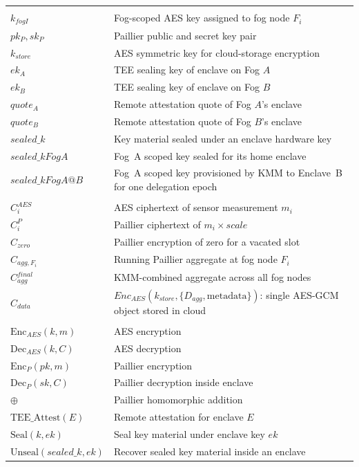 \documentclass[conference]{IEEEtran}
\begin{document}
\begin{table}[htbp]
\begin{tabular}{@{}>{\raggedright\arraybackslash}p{}>{\raggedright\arraybackslash}p{}@{}}
    \multicolumn{2}{l}{\textit{Key Material}} \\

    $k_{fogI}$ & Fog-scoped AES key assigned to fog node $F_i$ \\
    $pk_P, sk_P$ & Paillier public and secret key pair \\
    $k_{store}$ & AES symmetric key for cloud-storage encryption \\
    $ek_A$ & TEE sealing key of enclave on Fog $A$ \\
    $ek_B$ & TEE sealing key of enclave on Fog $B$ \\
    $quote_A$ & Remote attestation quote of Fog $A$'s enclave \\
    $quote_B$ & Remote attestation quote of Fog $B$'s enclave \\
    $sealed\_k$ & Key material sealed under an enclave hardware key \\
    $sealed\_kFogA$ & Fog~A scoped key sealed for its home enclave \\
    $sealed\_kFogA@B$ & Fog~A scoped key provisioned by KMM to Enclave~B for one delegation epoch \\

    \multicolumn{2}{l}{\textit{Ciphertexts}} \\

    $C_i^{AES}$ & AES ciphertext of sensor measurement $m_i$ \\
    $C_i^P$ & Paillier ciphertext of $m_i \times scale$ \\
    $C_{zero}$ & Paillier encryption of zero for a vacated slot \\
    $C_{agg,F_i}$ & Running Paillier aggregate at fog node $F_i$ \\
    $C_{agg}^{final}$ & KMM-combined aggregate across all fog nodes \\
    $C_{data}$ & $Enc_{AES}(k_{store}, \{D_{agg}, \mathrm{metadata}\})$: single AES-GCM object stored in cloud \\

    \multicolumn{2}{l}{\textit{Cryptographic Operations}} \\

    $\text{Enc}_{AES}(k,m)$ & AES encryption \\
    $\text{Dec}_{AES}(k,C)$ & AES decryption \\
    $\text{Enc}_{P}(pk,m)$ & Paillier encryption \\
    $\text{Dec}_{P}(sk,C)$ & Paillier decryption inside enclave \\
    $\oplus$ & Paillier homomorphic addition \\
    $\text{TEE\_Attest}(E)$ & Remote attestation for enclave $E$ \\
    $\text{Seal}(k,ek)$ & Seal key material under enclave key $ek$ \\
    $\text{Unseal}(sealed\_k,ek)$ & Recover sealed key material inside an enclave \\


\end{tabular}
\end{table}
\end{document}

